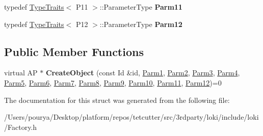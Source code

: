 \begin{DoxyCompactItemize}
\item 
\hypertarget{structLoki_1_1FactoryImpl_3_01AP_00_01Id_00_01LOKI__TYPELIST__12_07P1_00_01P2_00_01P3_00_01P4_00f13f17f8239845d239ca7a0cdddac4d0_a56bea5907b820ee755f300ee2524defd}{}typedef \hyperlink{classLoki_1_1TypeTraits}{Type\+Traits}$<$ P11 $>$\+::Parameter\+Type {\bfseries Parm11}\label{structLoki_1_1FactoryImpl_3_01AP_00_01Id_00_01LOKI__TYPELIST__12_07P1_00_01P2_00_01P3_00_01P4_00f13f17f8239845d239ca7a0cdddac4d0_a56bea5907b820ee755f300ee2524defd}

\item 
\hypertarget{structLoki_1_1FactoryImpl_3_01AP_00_01Id_00_01LOKI__TYPELIST__12_07P1_00_01P2_00_01P3_00_01P4_00f13f17f8239845d239ca7a0cdddac4d0_afc92e0f04f90386a55eb241ffc238f8c}{}typedef \hyperlink{classLoki_1_1TypeTraits}{Type\+Traits}$<$ P12 $>$\+::Parameter\+Type {\bfseries Parm12}\label{structLoki_1_1FactoryImpl_3_01AP_00_01Id_00_01LOKI__TYPELIST__12_07P1_00_01P2_00_01P3_00_01P4_00f13f17f8239845d239ca7a0cdddac4d0_afc92e0f04f90386a55eb241ffc238f8c}

\end{DoxyCompactItemize}
\subsection*{Public Member Functions}
\begin{DoxyCompactItemize}
\item 
\hypertarget{structLoki_1_1FactoryImpl_3_01AP_00_01Id_00_01LOKI__TYPELIST__12_07P1_00_01P2_00_01P3_00_01P4_00f13f17f8239845d239ca7a0cdddac4d0_a6f90b6c2aadeb2e34fb67106e29d8421}{}virtual A\+P $\ast$ {\bfseries Create\+Object} (const Id \&id, \hyperlink{classLoki_1_1EmptyType}{Parm1}, \hyperlink{classLoki_1_1EmptyType}{Parm2}, \hyperlink{classLoki_1_1EmptyType}{Parm3}, \hyperlink{classLoki_1_1EmptyType}{Parm4}, \hyperlink{classLoki_1_1EmptyType}{Parm5}, \hyperlink{classLoki_1_1EmptyType}{Parm6}, \hyperlink{classLoki_1_1EmptyType}{Parm7}, \hyperlink{classLoki_1_1EmptyType}{Parm8}, \hyperlink{classLoki_1_1EmptyType}{Parm9}, \hyperlink{classLoki_1_1EmptyType}{Parm10}, \hyperlink{classLoki_1_1EmptyType}{Parm11}, \hyperlink{classLoki_1_1EmptyType}{Parm12})=0\label{structLoki_1_1FactoryImpl_3_01AP_00_01Id_00_01LOKI__TYPELIST__12_07P1_00_01P2_00_01P3_00_01P4_00f13f17f8239845d239ca7a0cdddac4d0_a6f90b6c2aadeb2e34fb67106e29d8421}

\end{DoxyCompactItemize}


The documentation for this struct was generated from the following file\+:\begin{DoxyCompactItemize}
\item 
/\+Users/pourya/\+Desktop/platform/repos/tetcutter/src/3rdparty/loki/include/loki/Factory.\+h\end{DoxyCompactItemize}
